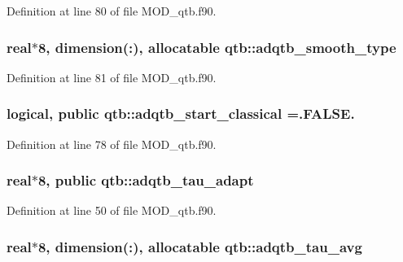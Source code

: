 Definition at line 80 of file M\-O\-D\-\_\-qtb.\-f90.

\hypertarget{classqtb_a0f377d6b63265e4e7d79114e82047458}{
\subsubsection[{adqtb\-\_\-smooth\-\_\-type}]{\setlength{\rightskip}{0pt plus 5cm}real$\ast$8, dimension(\-:), allocatable qtb\-::adqtb\-\_\-smooth\-\_\-type}}\label{classqtb_a0f377d6b63265e4e7d79114e82047458}


Definition at line 81 of file M\-O\-D\-\_\-qtb.\-f90.

\hypertarget{classqtb_a34e96ac736106bc3f7d5bd460e293bc8}{
\subsubsection[{adqtb\-\_\-start\-\_\-classical}]{\setlength{\rightskip}{0pt plus 5cm}logical, public qtb\-::adqtb\-\_\-start\-\_\-classical =.F\-A\-L\-S\-E.}}\label{classqtb_a34e96ac736106bc3f7d5bd460e293bc8}


Definition at line 78 of file M\-O\-D\-\_\-qtb.\-f90.

\hypertarget{classqtb_ae57c1be5fd10880bcbb8452412682dd1}{
\subsubsection[{adqtb\-\_\-tau\-\_\-adapt}]{\setlength{\rightskip}{0pt plus 5cm}real$\ast$8, public qtb\-::adqtb\-\_\-tau\-\_\-adapt}}\label{classqtb_ae57c1be5fd10880bcbb8452412682dd1}


Definition at line 50 of file M\-O\-D\-\_\-qtb.\-f90.

\hypertarget{classqtb_a2ecb6eb3b6006ebb6238554d82b65f4f}{
\subsubsection[{adqtb\-\_\-tau\-\_\-avg}]{\setlength{\rightskip}{0pt plus 5cm}real$\ast$8, dimension(\-:), allocatable qtb\-::adqtb\-\_\-tau\-\_\-avg}}\label{classqtb_a2ecb6eb3b6006ebb6238554d82b65f4f}


